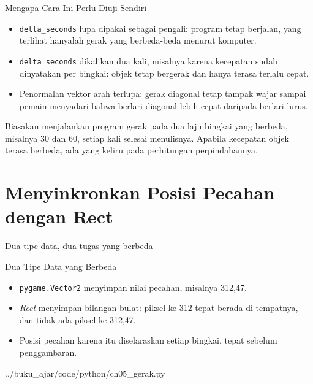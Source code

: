 \documentclass[aspectratio=169,10pt]{beamer}
\begin{document}
\begin{frame}{Mengapa Cara Ini Perlu Diuji Sendiri}
\begin{itemize}
  \item \texttt{delta\_seconds} lupa dipakai sebagai pengali: program tetap
        berjalan, yang terlihat hanyalah gerak yang berbeda-beda menurut
        komputer.
  \item \texttt{delta\_seconds} dikalikan dua kali, misalnya karena kecepatan
        sudah dinyatakan per bingkai: objek tetap bergerak dan hanya terasa
        terlalu cepat.
  \item Penormalan vektor arah terlupa: gerak diagonal tetap tampak wajar sampai
        pemain menyadari bahwa berlari diagonal lebih cepat daripada berlari
        lurus.
\end{itemize}
\vspace{0.16cm}
\begin{kiat}
Biasakan menjalankan program gerak pada dua laju bingkai yang berbeda, misalnya
30 dan 60, setiap kali selesai menulisnya. Apabila kecepatan objek terasa
berbeda, ada yang keliru pada perhitungan perpindahannya.
\end{kiat}
\end{frame}

\section{Menyinkronkan Posisi Pecahan dengan Rect}
  {Dua tipe data, dua tugas yang berbeda}

\begin{frame}[fragile]{Dua Tipe Data yang Berbeda}
\begin{itemize}
  \item \texttt{pygame.Vector2} menyimpan nilai pecahan, misalnya 312,47.
  \item \emph{Rect} menyimpan bilangan bulat: piksel ke-312 tepat berada di
        tempatnya, dan tidak ada piksel ke-312,47.
  \item Posisi pecahan karena itu diselaraskan setiap bingkai, tepat sebelum
        penggambaran.
\end{itemize}
\vspace{0.10cm}

  {../buku_ajar/code/python/ch05_gerak.py}
\end{frame}
\end{document}
